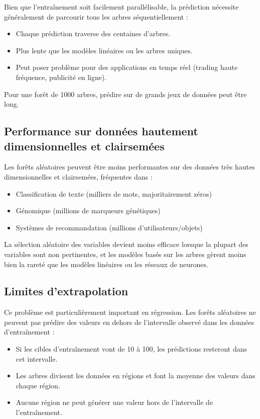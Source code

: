 Bien que l’entraînement soit facilement parallélisable, la prédiction nécessite généralement de parcourir tous les arbres séquentiellement :

\begin{itemize}
    \item Chaque prédiction traverse des centaines d’arbres.
    \item Plus lente que les modèles linéaires ou les arbres uniques.
    \item Peut poser problème pour des applications en temps réel (trading haute fréquence, publicité en ligne).
\end{itemize}

Pour une forêt de 1000 arbres, prédire sur de grands jeux de données peut être long.

\subsection{ Performance sur données hautement dimensionnelles et clairsemées}

Les forêts aléatoires peuvent être moins performantes sur des données très hautes dimensionnelles et clairsemées, fréquentes dans :

\begin{itemize}
    \item Classification de texte (milliers de mots, majoritairement zéros)
    \item Génomique (millions de marqueurs génétiques)
    \item Systèmes de recommandation (millions d’utilisateurs/objets)
\end{itemize}

La sélection aléatoire des variables devient moins efficace lorsque la plupart des variables sont non pertinentes, et les modèles basés sur les arbres gèrent moins bien la rareté que les modèles linéaires ou les réseaux de neurones.

\subsection{ Limites d’extrapolation}

Ce problème est particulièrement important en régression. Les forêts aléatoires ne peuvent pas prédire des valeurs en dehors de l’intervalle observé dans les données d’entraînement :

\begin{itemize}
    \item Si les cibles d’entraînement vont de 10 à 100, les prédictions resteront dans cet intervalle.
    \item Les arbres divisent les données en régions et font la moyenne des valeurs dans chaque région.
    \item Aucune région ne peut générer une valeur hors de l’intervalle de l’entraînement.
\end{itemize}

